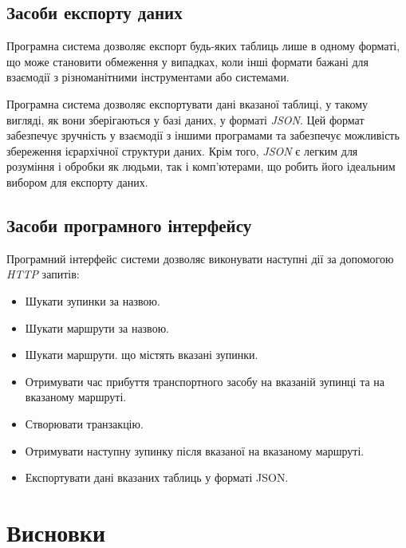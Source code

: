 \documentclass[oneside,14pt]{extarticle}
\begin{document}

\subsection{Засоби експорту даних}
Програмна система дозволяє експорт будь-яких таблиць лише в одному форматі, що може становити обмеження у випадках, коли інші формати бажані для взаємодії з різноманітними інструментами або системами.

Програмна система дозволяє експортувати дані вказаної таблиці, у такому вигляді, як вони зберігаються у базі даних, у форматі \textit{JSON}. Цей формат забезпечує зручність у взаємодії з іншими програмами та забезпечує можливість збереження ієрархічної структури даних. Крім того, \textit{JSON} є легким для розуміння і обробки як людьми, так і комп'ютерами, що робить його ідеальним вибором для експорту даних.

\subsection{Засоби програмного інтерфейсу}
Програмний інтерфейс системи дозволяє виконувати наступні дії за допомогою \textit{HTTP} запитів:
\begin{itemize}
\item Шукати зупинки за назвою.
\item Шукати маршрути за назвою.
\item Шукати маршрути. що містять вказані зупинки.
\item Отримувати час прибуття транспортного засобу на вказаній зупинці та на вказаному маршруті.
\item Створювати транзакцію.
\item Отримувати наступну зупинку після вказаної на вказаному маршруті.
\item Експортувати дані вказаних таблиць у форматі JSON.

\end{itemize}

\newpage

\section*{Висновки}
\setcounter{subsection}{0}
\end{document}
